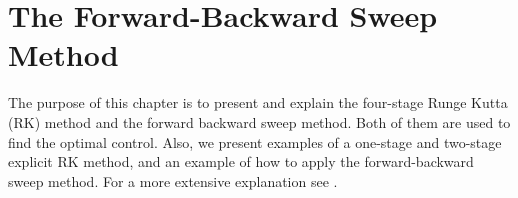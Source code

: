 %
\chapter{The Forward-Backward Sweep Method}
    The purpose of this chapter is to present and explain the four-stage Runge 
    Kutta (RK) method and the forward backward sweep method. Both of them are 
    used to find the optimal control. Also, we present examples of a one-stage 
    and two-stage explicit RK method, and an example of how to apply the
    forward-backward sweep method. For a more extensive explanation see
    \cite{griffiths2010numerical}.

